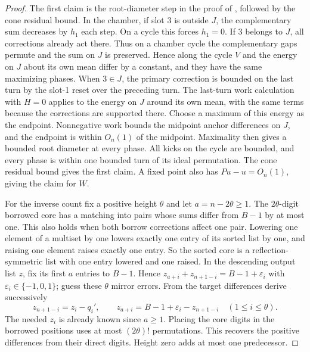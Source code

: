 \documentclass[11pt]{amsart}
\theoremstyle{definition}
\begin{document}
\begin{proof}
The first claim is the root-diameter step in the proof of
\cite[Theorem~1]{G10}, followed by the cone residual bound.
In the chamber, if slot 3 is outside \(J\), the complementary sum
decreases by \(h_1\) each step. On a cycle this forces \(h_1=0\).
If 3 belongs to \(J\), all corrections already act there. Thus
on a chamber cycle the complementary gaps permute and the sum on \(J\)
is preserved. Hence along the cycle \(V\) and the energy on \(J\) about
its own mean differ by a constant, and they have the same maximizing
phases. When \(3\in J\), the primary correction is bounded on the last
turn by the slot-1 reset over the preceding turn.
The last-turn work calculation with \(H=0\) applies
to the energy on \(J\) around its own mean, with the same terms because
the corrections are supported there. Choose a maximum of this energy
as the endpoint. Nonnegative work bounds the midpoint anchor
differences on \(J\), and the endpoint is within \(O_n(1)\) of the
midpoint. Maximality then gives a bounded root diameter at every
phase. All kicks on the cycle are bounded, and every phase is within
one bounded turn of its ideal permutation. The cone residual bound
gives the first claim. A fixed point also has \(Pu-u=O_n(1)\),
giving the claim for \(W\).

For the inverse count fix a positive height \(\theta\) and let
\(a=n-2\theta\ge1\). The \(2\theta\)-digit borrowed core has a matching
into pairs whose sums differ from \(B-1\) by at most one.
This also holds when both borrow corrections affect one pair.
Lowering one element of a multiset by one lowers exactly one entry of
its sorted list by one, and raising one element raises exactly one
entry. So the sorted core is a reflection-symmetric list with one entry
lowered and one raised. In the descending output list \(z\), fix its
first \(a\) entries to \(B-1\). Hence
\(z_{a+i}+z_{n+1-i}=B-1+\varepsilon_i\) with
\(\varepsilon_i\in\{-1,0,1\}\); guess these \(\theta\) mirror errors.
From the target differences derive successively
\[
 z_{n+1-i}=z_i-q_i',\qquad
 z_{a+i}=B-1+\varepsilon_i-z_{n+1-i}\quad(1\le i\le\theta).
\]
The needed \(z_i\) is already known since \(a\ge1\).
Placing the core digits in the borrowed positions uses at most
\((2\theta)!\) permutations. This recovers the positive differences
from their direct digits. Height zero adds at most one predecessor.
\end{proof}
\end{document}

